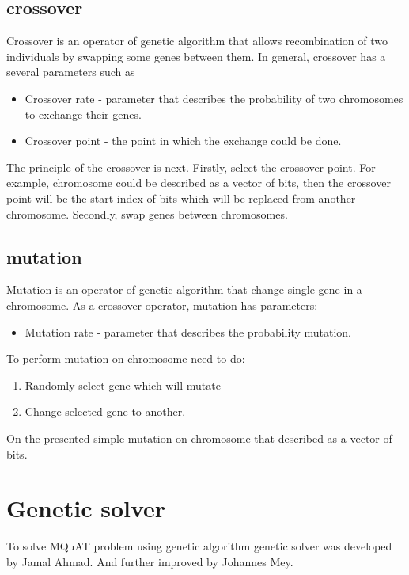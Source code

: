 \subsection{crossover}
Crossover is an operator of genetic algorithm that allows recombination of two individuals by swapping some genes between them.
In general, crossover has a several parameters such as
\begin{itemize}
	\item Crossover rate - parameter that describes the probability of two chromosomes to exchange their genes.
	\item Crossover point - the point in which the exchange could be done.
\end{itemize}

The principle of the crossover is next.
Firstly, select the crossover point. For example, chromosome could be described as a vector of bits, then the crossover point will be the start index of bits which will be replaced from another chromosome.
Secondly, swap genes between chromosomes.


\subsection{mutation}

Mutation is an operator of genetic algorithm that change single gene in a chromosome. As a crossover operator, mutation has parameters:

\begin{itemize}
	\item Mutation rate - parameter that describes the probability mutation.
\end{itemize}

To perform mutation on chromosome need to do:
\begin{enumerate}
	\item Randomly select gene which will mutate
	\item Change selected gene to another.
\end{enumerate}

On the  presented simple mutation on chromosome that described as a vector of bits.


\section{Genetic solver}
To solve MQuAT problem using genetic algorithm genetic solver was developed by Jamal Ahmad. And further improved by Johannes Mey.

